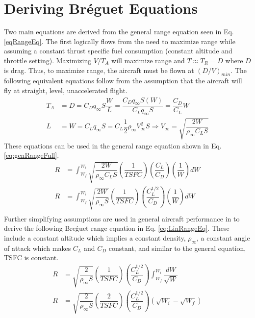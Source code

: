 \section{Deriving Br\'eguet Equations}
\label{section: derive equations}
Two main equations are derived from the general range equation seen in Eq. \ref{eqRangeEq}. The first logically flows from the need to maximize range while assuming a constant thrust specific fuel consumption (constant altitude and throttle setting). Maximizing $V/T_A$ will maximize range and $T \approx T_R = D$ where $D$ is drag. Thus, to maximize range, the aircraft must be flown at $(D/V)_{min}$. The following equivalent equations follow from the assumption that the aircraft will fly at straight, level, unaccelerated flight.
\begin{align}
    T_A&=D = C_Dq_{\infty}S \dfrac{W}{L} = \dfrac{C_Dq_{\infty}S(W)}{C_Lq_{\infty}S} = \dfrac{C_D}{C_L}W\\
    L &= W = C_Lq_{\infty}S = C_L\dfrac{1}{2}\rho_{\infty}V^2_{\infty}S \Rightarrow V_{\infty} = \sqrt{\dfrac{2W}{\rho_{\infty}C_LS}}
    \label{eq: VequivalentEq}
\end{align}
These equations can be used in the general range equation shown in Eq. \ref{eq:genRangeFull}.
\begin{equation}
\label{eq:genRangeFull}
    \begin{aligned}
        R &= \int_{W_f}^{W_i}\sqrt{\dfrac{2W}{\rho_{\infty}C_LS}}\left(\dfrac{1}{TSFC}\right)\left(\dfrac{C_L}{C_D}\right)\left(\dfrac{1}{W}\right)dW\\
        R &= \int_{W_f}^{W_i}\sqrt{\dfrac{2W}{\rho_{\infty}S}}\left(\dfrac{1}{TSFC}\right)\left(\dfrac{C_L^{1/2}}{C_D}\right)\left(\dfrac{1}{W}\right)dW\\
    \end{aligned}
\end{equation}
Further simplifying assumptions are used in general aircraft performance in \cite{IntroACMechanics} to derive the following Bre\'guet range equation in Eq. \ref{eq:LinRangeEq}. These include a constant altitude which implies a constant density, $\rho_{\infty}$, a constant angle of attack which makes $C_L$ and $C_D$ constant, and similar to the general equation, TSFC is constant.
\begin{equation}
\label{eq:LinRangeEq}
    \begin{aligned}
        R &= \sqrt{\dfrac{2}{\rho_{\infty}S}}\left(\dfrac{1}{TSFC}\right)\left(\dfrac{C_L^{1/2}}{C_D}\right)\int_{W_f}^{W_i}\dfrac{dW}{\sqrt{W}}\\
        R &= \sqrt{\dfrac{2}{\rho_{\infty}S}}\left(\dfrac{2}{TSFC}\right)\left(\dfrac{C_L^{1/2}}{C_D}\right)(\sqrt{W_i}-\sqrt{W_f})
    \end{aligned}
\end{equation} \par
